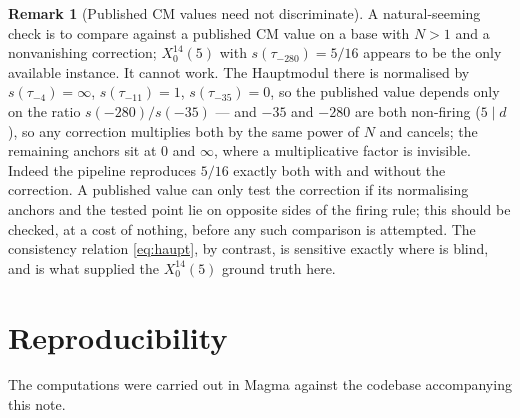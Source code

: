 \documentclass[11pt,reqno]{amsart}
\theoremstyle{plain}
\theoremstyle{definition}
\newtheorem{remark}[theorem]{Remark}
\begin{document}
\begin{remark}[Published CM values need not discriminate]\label{rem:gy36}
A natural-seeming check is to compare against a published CM value on a base with $N>1$ and a
nonvanishing correction; $X_0^{14}(5)$ with $s(\tau_{-280})=5/16$ \cite[Ex.~36]{GY} appears to be
the only available instance. It cannot work. The Hauptmodul there is normalised by
$s(\tau_{-4})=\infty$, $s(\tau_{-11})=1$, $s(\tau_{-35})=0$, so the published value depends only on
the ratio $s(-280)/s(-35)$ --- and $-35$ and $-280$ are both non-firing ($5\mid d$), so any
correction multiplies both by the same power of $N$ and cancels; the remaining anchors sit at $0$
and $\infty$, where a multiplicative factor is invisible. Indeed the pipeline reproduces $5/16$
exactly both with and without the correction. A published value can only test the correction if
its normalising anchors and the tested point lie on opposite sides of the firing rule; this should
be checked, at a cost of nothing, before any such comparison is attempted. The consistency
relation \eqref{eq:haupt}, by contrast, is sensitive exactly where \cite[Ex.~36]{GY} is blind, and
is what supplied the $X_0^{14}(5)$ ground truth here.
\end{remark}

\appendix
\section{Reproducibility}\label{app:repro}

The computations were carried out in Magma against the codebase accompanying this note.
\end{document}
